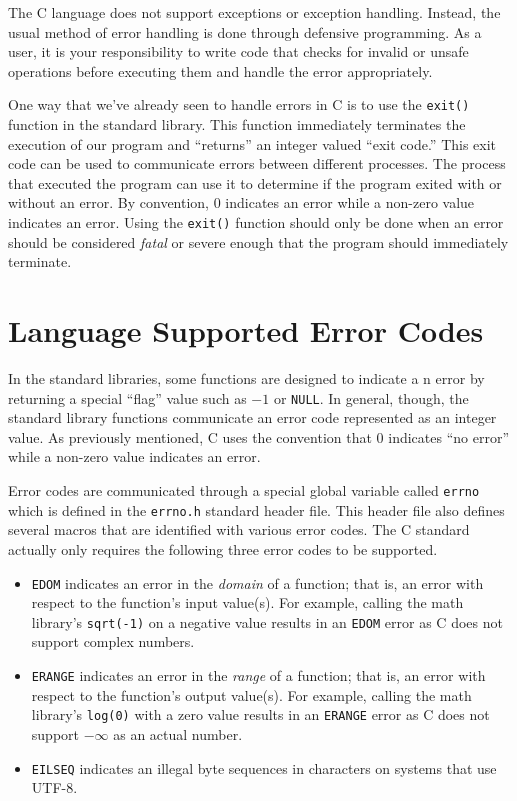 

The C language does not support exceptions or exception handling.
Instead, the usual method of error handling is done through 
defensive programming.  As a user, it is your responsibility to
write code that checks for invalid or unsafe operations before
executing them and handle the error appropriately.

One way that we've already seen to handle errors in C is to use
the \texttt{exit()} function in the standard library.  This function
immediately terminates the execution of our program and ``returns''
an integer valued ``exit code.''  This exit code can be used to
communicate errors between different processes.  The process that
executed the program can use it to determine if the program exited
with or without an error.  By convention, 0 indicates an error while
a non-zero value indicates an error.  Using the \texttt{exit()} 
function should only be done when an error should be considered
\emph{fatal} or severe enough that the program should immediately
terminate.

\section{Language Supported Error Codes}
\label{section:errno}

In the standard libraries, some functions are designed to indicate a
n error by returning a special ``flag'' value such as $-1$ or 
\texttt{NULL}.  In general, though, the standard library functions
communicate an error code represented as an integer value.
As previously mentioned, C uses the convention that 0 
indicates ``no error'' while a non-zero value indicates an error.

Error codes are communicated through a special global variable called
\texttt{errno} which is defined in the \texttt{errno.h} 
standard header file.  This header file also defines several macros 
that are identified with various error codes.  The C standard actually
only requires the following three error codes to be supported.  

\begin{itemize}
  \item \texttt{EDOM} indicates an error in the \emph{domain} 
  	of a function; that is, an error with respect to the function's input value(s).
	For example, calling the math library's \texttt{sqrt(-1)} on a negative
	value results in an \texttt{EDOM} error as C does not support
	complex numbers.
  \item \texttt{ERANGE} indicates an error in the \emph{range}
  	of a function; that is, an error with respect to the function's output value(s).
	For example, calling the math library's \texttt{log(0)} with a zero
	value results in an \texttt{ERANGE} error as C does not 
	support $-\infty$ as an actual number.
  \item \texttt{EILSEQ} indicates an illegal byte sequences in 
  	characters on systems that use UTF-8.
\end{itemize}

